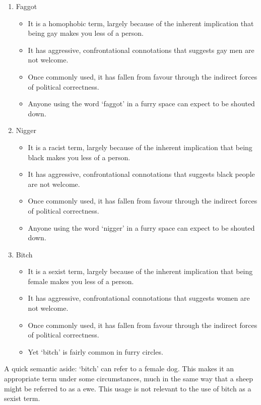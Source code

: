 \begin{enumerate}
  \item Faggot

  \begin{itemize}
    \item It is a homophobic term, largely because of the inherent implication that being gay makes you less of a person.
    \item It has aggressive, confrontational connotations that suggests gay men are not welcome.
    \item Once commonly used, it has fallen from favour through the indirect forces of political correctness.
    \item Anyone using the word `faggot' in a furry space can expect to be shouted down.
  \end{itemize}

  \item Nigger

  \begin{itemize}
    \item It is a racist term, largely because of the inherent implication that being black makes you less of a person.
    \item It has aggressive, confrontational connotations that suggests black people are not welcome.
    \item Once commonly used, it has fallen from favour through the indirect forces of political correctness.
    \item Anyone using the word `nigger' in a furry space can expect to be shouted down.
  \end{itemize}

  \item Bitch

  \begin{itemize}
    \item It is a sexist term, largely because of the inherent implication that being female makes you less of a person.
    \item It has aggressive, confrontational connotations that suggests women are not welcome.
    \item Once commonly used, it has fallen from favour through the indirect forces of political correctness.
    \item Yet `bitch' is fairly common in furry circles.
  \end{itemize}
\end{enumerate}

A quick semantic aside: `bitch' can refer to a female dog. This makes it an appropriate term under some circumstances, much in the same way that a sheep might be referred to as a ewe. This usage is not relevant to the use of bitch as a sexist term.

